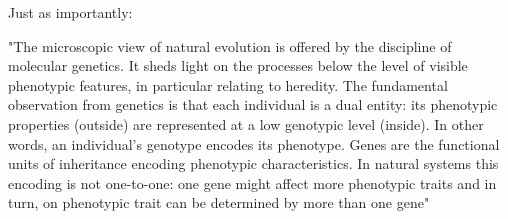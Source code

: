 

Just as importantly:

"The microscopic view of natural evolution is offered by the discipline of molecular genetics. It sheds light on the processes below the level of visible phenotypic features, in particular relating to heredity. The fundamental observation from genetics is that each individual is a dual entity: its phenotypic properties (outside) are represented at a low genotypic level (inside). In other words, an individual's genotype encodes its phenotype. Genes are the functional units of inheritance encoding phenotypic characteristics. In natural systems this encoding is not one-to-one: one gene might affect more phenotypic traits and in turn, on phenotypic trait can be determined by more than one gene" \cite{EibenSmith2003}

